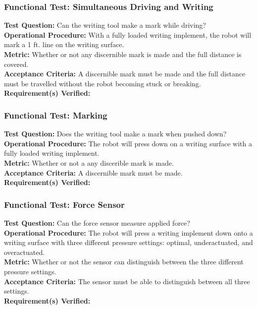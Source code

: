 \subsubsection{Functional Test: Simultaneous Driving and Writing}
\label{test:writing_ft_both}
\textbf{Test Question:} Can the writing tool make a mark while driving? \\
\textbf{Operational Procedure:} With a fully loaded writing implement, the robot will mark a 1 ft. line on the writing surface.\\
\textbf{Metric:} Whether or not any discernible mark is made and the full distance is covered. \\
\textbf{Acceptance Criteria:} A discernible mark must be made and the full distance must be travelled without the robot becoming stuck or breaking.\\
\textbf{Requirement(s) Verified:} 

\subsubsection{Functional Test: Marking}
\label{test:writing_ft_mark}
\textbf{Test Question:} Does the writing tool make a mark when pushed down? \\
\textbf{Operational Procedure:} The robot will press down on a writing surface with a fully loaded writing implement. \\
\textbf{Metric:} Whether or not a any discerible mark is made. \\
\textbf{Acceptance Criteria:} A discernible mark must be made.\\
\textbf{Requirement(s) Verified:} 

\subsubsection{Functional Test: Force Sensor}
\label{test:writing_ft_force}
\textbf{Test Question:} Can the force sensor measure applied force? \\
\textbf{Operational Procedure:} The robot will press a writing implement down onto a writing surface with three different pressure settings: optimal, underactuated, and overactuated. \\
\textbf{Metric:} Whether or not the sensor can distinguish between the three different pressure settings. \\
\textbf{Acceptance Criteria:} The sensor must be able to distinguish between all three settings.\\
\textbf{Requirement(s) Verified:}  \\


